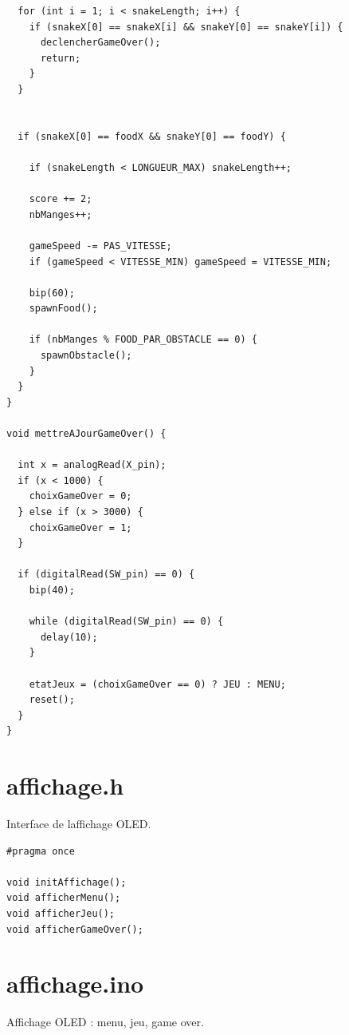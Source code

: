 \documentclass[a4paper,10pt]{article}
\begin{document}
\begin{lstlisting}
  for (int i = 1; i < snakeLength; i++) {
    if (snakeX[0] == snakeX[i] && snakeY[0] == snakeY[i]) {
      declencherGameOver();
      return;
    }
  }


  if (snakeX[0] == foodX && snakeY[0] == foodY) {

    if (snakeLength < LONGUEUR_MAX) snakeLength++;

    score += 2;
    nbManges++;

    gameSpeed -= PAS_VITESSE;
    if (gameSpeed < VITESSE_MIN) gameSpeed = VITESSE_MIN;

    bip(60);
    spawnFood();

    if (nbManges % FOOD_PAR_OBSTACLE == 0) {
      spawnObstacle();
    }
  }
}

void mettreAJourGameOver() {

  int x = analogRead(X_pin);
  if (x < 1000) {
    choixGameOver = 0;
  } else if (x > 3000) {
    choixGameOver = 1;
  }

  if (digitalRead(SW_pin) == 0) {
    bip(40);

    while (digitalRead(SW_pin) == 0) {
      delay(10);
    }

    etatJeux = (choixGameOver == 0) ? JEU : MENU;
    reset();
  }
}
\end{lstlisting}

\section{affichage.h}
Interface de l\textquotesingle{}affichage OLED.

\begin{lstlisting}
#pragma once

void initAffichage();
void afficherMenu();
void afficherJeu();
void afficherGameOver();
\end{lstlisting}

\section{affichage.ino}
Affichage OLED : menu, jeu, game over.
\end{document}
